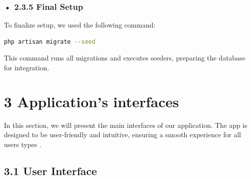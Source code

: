 \documentclass[12pt]{report}
\begin{document}
\subsubsection*{• 2.3.5 Final Setup}
To finalize setup, we used the following command:

\begin{lstlisting}[style=darkbash, language=bash, caption={Laravel command to run migrations and seeders}, belowcaptionskip=10pt]
	php artisan migrate --seed
\end{lstlisting}
	

\noindent This command runs all migrations and executes seeders, preparing the database for integration.

\section*{3 Application's interfaces}
In this section, we will present the main interfaces of our application. The app is designed to be user-friendly and intuitive, ensuring a smooth experience for all users types .

\subsection*{3.1 User Interface}
\vspace{0.5cm}
\end{document}
